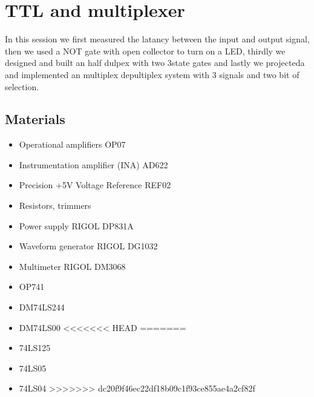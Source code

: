 \chapter{TTL and multiplexer}
In this session we first measured the latancy between the input and output signal, then we used a NOT gate with open collector to turn on a LED, thirdly we designed and built an half dulpex with two 3state gates and lastly we projecteda and implemented an multiplex depultiplex system with 3 signals and two bit of selection.

\section{Materials}
\begin{itemize}
\item Operational amplifiers OP07
\item Instrumentation amplifier (INA) AD622
\item Precision +5V Voltage Reference REF02
\item Resistors, trimmers
\item Power supply RIGOL DP831A
\item Waveform generator RIGOL DG1032
\item Multimeter RIGOL DM3068
\item OP741
\item DM74LS244
\item DM74LS00
<<<<<<< HEAD
=======
\item 74LS125
\item 74LS05
\item 74LS04
>>>>>>> dc20f9f46ec22df18b09c1f93ce855ae4a2cf82f
\end{itemize}
